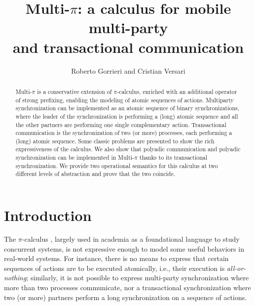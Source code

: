 \documentclass[submission,copyright,creativecommons]{eptcs}
\title{Multi-$\pi$: a calculus for mobile multi-party\\
and transactional communication}
\author{Roberto Gorrieri and Cristian Versari
\institute{Dipartimento di Scienze dell'Informazione, Universit\`a di
Bologna, \\Mura A. Zamboni, 7,
40127 Bologna, Italy}
\email{\{gorrieri, versari\}@cs.unibo.it}
}
\begin{document}
\maketitle

\begin{abstract}
Multi-$\pi$ is a conservative extension of $\pi$-calculus, enriched with an additional 
operator of strong prefixing, enabling the modeling of atomic sequences of actions.
Multiparty synchronization can be
implemented as an atomic sequence of binary synchronizations, where the leader of the synchronization
is performing a (long) atomic sequence and all the other partners are performing one single complementary action.
Transactional communication is the synchronization of two (or more) processes, each performing a (long)
atomic sequence.
Some classic problems are presented to show the rich expressiveness of the calculus.
We also show that polyadic communication \cite{Mil91} and polyadic synchronization \cite{CM03}
can be implemented in Multi-$\pi$ thanks to its transactional synchronization.
We provide two operational semantics for this calculus
at two different levels of abstraction and prove that the two coincide.
\end{abstract}


\section{Introduction\\[-.8cm]}
The %
$\pi$-calculus  \cite{MPW}, largely used in academia as a foundational language to study concurrent systems, 
is not expressive enough to model some useful behaviors in real-world systems. For instance, there is no means to 
express that certain sequences of actions are to be executed atomically, i.e., their execution is {\em all-or-nothing}; 
similarly, it is not possible to express multi-party synchronization where more than two processes communicate, nor
a transactional synchronization where two (or more) partners perform a long synchronization on a sequence of
actions.
\end{document}
